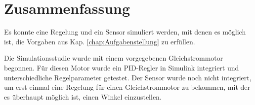 \newpage




\chapter{Zusammenfassung}
\label{chap:Zusammenfassung}

Es konnte eine Regelung und ein Sensor simuliert werden, mit denen es möglich ist, die Vorgaben aus Kap. \ref{chap:Aufgabenstellung} zu erfüllen.

Die Simulationsstudie wurde mit einem vorgegebenen Gleichstrommotor begonnen.
Für diesen Motor wurde ein PID-Regler in Simulink integriert und unterschiedliche Regelparameter getestet.
Der Sensor wurde noch nicht integriert, um erst einmal eine Regelung für einen Gleichstrommotor zu bekommen, mit der es überhaupt möglich ist, einen Winkel einzustellen.

